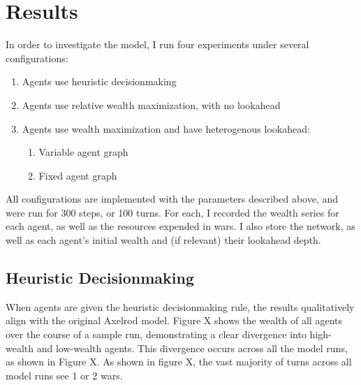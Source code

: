 \documentclass{article}
\begin{document}
\section{Results}

In order to investigate the model, I run four experiments under several configurations:
\begin{enumerate}
	\item Agents use heuristic decisionmaking
	\item Agents use relative wealth maximization, with no lookahead
	\item Agents use wealth maximization and have heterogenous lookahead: 
	\begin{enumerate}
		\item Variable agent graph
		\item Fixed agent graph
	\end{enumerate}
\end{enumerate}

All configurations are implemented with the parameters described above, and were run for 300 steps, or 100 turns. For each, I recorded the wealth series for each agent, as well as the resources expended in wars. I also store the network, as well as each agent's initial wealth and (if relevant) their lookahead depth. 

\subsection{Heuristic Decisionmaking}
When agents are given the heuristic decisionmaking rule, the results qualitatively align with the original Axelrod model. Figure X shows the wealth of all agents over the course of a sample run, demonstrating a clear divergence into high-wealth and low-wealth agents. This divergence occurs across all the model runs, as shown in Figure X. As shown in figure X, the vast majority of turns across all model runs see 1 or 2 wars. 
\end{document}
